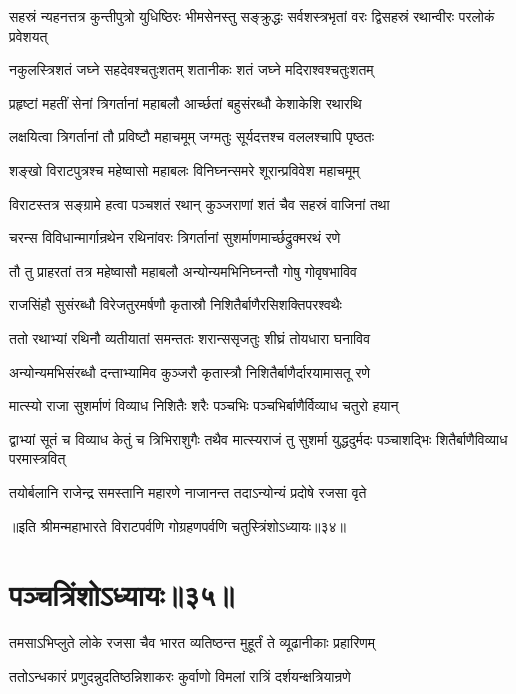 \threelineshloka
{सहस्रं न्यहनत्तत्र कुन्तीपुत्रो युधिष्ठिरः}
{भीमसेनस्तु सङ्क्रुद्धः सर्वशस्त्रभृतां वरः}
{द्विसहस्रं रथान्वीरः परलोकं प्रवेशयत्}


\twolineshloka
{नकुलस्त्रिशतं जघ्ने सहदेवश्चतुःशतम्}
{शतानीकः शतं जघ्ने मदिराश्वश्चतुःशतम्}


\twolineshloka
{प्रहृष्टां महतीं सेनां त्रिगर्तानां महाबलौ}
{आर्च्छतां बहुसंरब्धौ केशाकेशि रथारथि}


\twolineshloka
{लक्षयित्वा त्रिगर्तानां तौ प्रविष्टौ महाचमूम्}
{जग्मतुः सूर्यदत्तश्च वललश्चापि पृष्ठतः}


\twolineshloka
{शङ्खो विराटपुत्रश्च महेष्वासो महाबलः}
{विनिघ्नन्समरे शूरान्प्रविवेश महाचमूम्}


\twolineshloka
{विराटस्तत्र सङ्ग्रामे हत्वा पञ्चशतं रथान्}
{कुञ्जराणां शतं चैव सहस्रं वाजिनां तथा}


\twolineshloka
{चरन्स विविधान्मार्गान्रथेन रथिनांवरः}
{त्रिगर्तानां सुशर्माणमार्च्छद्रुक्मरथं रणे}


\twolineshloka
{तौ तु प्राहरतां तत्र महेष्वासौ महाबलौ}
{अन्योन्यमभिनिघ्नन्तौ गोषु गोवृषभाविव}


\twolineshloka
{राजसिंहौ सुसंरब्धौ विरेजतुरमर्षणौ}
{कृतास्रौ निशितैर्बाणैरसिशक्तिपरश्वथैः}


\twolineshloka
{ततो रथाभ्यां रथिनौ व्यतीयातां समन्ततः}
{शरान्ससृजतुः शीघ्रं तोयधारा घनाविव}


\twolineshloka
{अन्योन्यमभिसंरब्धौ दन्ताभ्यामिव कुञ्जरौ}
{कृतास्त्रौ निशितैर्बाणैर्दारयामासतू रणे}


\twolineshloka
{मात्स्यो राजा सुशर्माणं विव्याध निशितैः शरैः}
{पञ्चभिः पञ्चभिर्बाणैर्विव्याध चतुरो हयान्}


\threelineshloka
{द्वाभ्यां सूतं च विव्याध केतुं च त्रिभिराशुगैः}
{तथैव मात्स्यराजं तु सुशर्मा युद्धदुर्मदः}
{पञ्चाशद्भिः शितैर्बाणैविव्याध परमास्त्रवित्}


\twolineshloka
{तयोर्बलानि राजेन्द्र समस्तानि महारणे}
{नाजानन्त तदाऽन्योन्यं प्रदोषे रजसा वृते}

॥इति श्रीमन्महाभारते विराटपर्वणि गोग्रहणपर्वणि चतुस्त्रिंशोऽध्यायः॥३४॥

\chapter{पञ्चत्रिंशोऽध्यायः॥३५॥}

\twolineshloka
{तमसाऽभिप्लुते लोके रजसा चैव भारत}
{व्यतिष्ठन्त मुहूर्तं ते व्यूढानीकाः प्रहारिणम्}


\twolineshloka
{ततोऽन्धकारं प्रणुदन्नुदतिष्ठन्निशाकरः}
{कुर्वाणो विमलां रात्रिं दर्शयन्क्षत्रियान्रणे}


